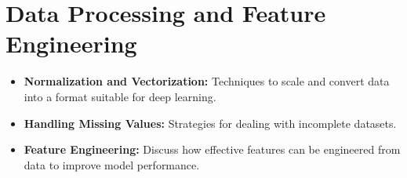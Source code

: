 
\section{Data Processing and Feature Engineering}
\begin{itemize}
    \item \textbf{Normalization and Vectorization:} Techniques to scale and convert data into a format suitable for deep learning.
    \item \textbf{Handling Missing Values:} Strategies for dealing with incomplete datasets.
    \item \textbf{Feature Engineering:} Discuss how effective features can be engineered from data to improve model performance.
\end{itemize}